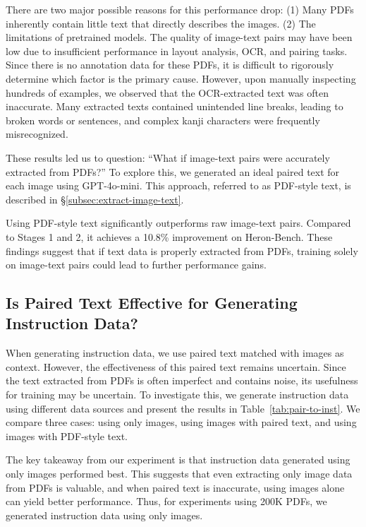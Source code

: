There are two major possible reasons for this performance drop:
(1) Many PDFs inherently contain little text that directly describes the images.
(2) The limitations of pretrained models. The quality of image-text pairs may have been low due to insufficient performance in layout analysis, OCR, and pairing tasks.
Since there is no annotation data for these PDFs, it is difficult to rigorously determine which factor is the primary cause.
However, upon manually inspecting hundreds of examples, we observed that the OCR-extracted text was often inaccurate.
Many extracted texts contained unintended line breaks, leading to broken words or sentences, and complex kanji characters were frequently misrecognized.

These results led us to question: ``What if image-text pairs were accurately extracted from PDFs?''
To explore this, we generated an ideal paired text for each image using GPT-4o-mini.
This approach, referred to as PDF-style text, is described in \S\ref{subsec:extract-image-text}.

Using PDF-style text significantly outperforms raw image-text pairs.
Compared to Stages 1 and 2, it achieves a 10.8\% improvement on Heron-Bench.
These findings suggest that if text data is properly extracted from PDFs, training solely on image-text pairs could lead to further performance gains.


\subsection{Is Paired Text Effective for Generating Instruction Data?}\label{subsec:paired-text-to-inst}
When generating instruction data, we use paired text matched with images as context.
However, the effectiveness of this paired text remains uncertain.
Since the text extracted from PDFs is often imperfect and contains noise, its usefulness for training may be uncertain.
To investigate this, we generate instruction data using different data sources and present the results in Table~\ref{tab:pair-to-inst}.
We compare three cases: using only images, using images with paired text, and using images with PDF-style text.

The key takeaway from our experiment is that instruction data generated using only images performed best.
This suggests that even extracting only image data from PDFs is valuable, and when paired text is inaccurate, using images alone can yield better performance.
Thus, for experiments using 200K PDFs, we generated instruction data using only images.

